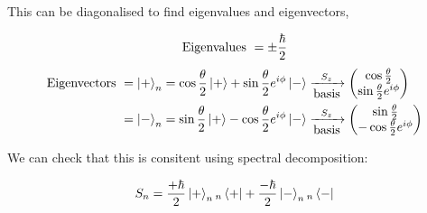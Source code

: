 \documentclass[english, 11pt]{article}
\begin{document}
      This can be diagonalised to find eigenvalues and eigenvectors,

      \[ \mbox{Eigenvalues } = \pm\frac{\hbar}{2} \]
     \begin{align*}
       \mbox{Eigenvectors } & = \left|+\right\rangle_n = \cos\frac{\theta}{2}\left|+\right\rangle + \sin\frac{\theta}{2}e^{i\phi}\left|-\right\rangle \xrightarrow[\mbox{basis}]{S_z} \left(\begin{matrix}\cos\frac{\theta}{2} \\ \sin\frac{\theta}{2}e^{i\phi}\end{matrix}\right) \\
        & = \left|-\right\rangle_n =  \sin\frac{\theta}{2}\left|+\right\rangle - \cos\frac{\theta}{2}e^{i\phi}\left|-\right\rangle  \xrightarrow[\mbox{basis}]{S_z} \left(\begin{matrix}\sin\frac{\theta}{2} \\ -\cos\frac{\theta}{2}e^{i\phi}\end{matrix}\right)
     \end{align*}

     We can check that this is consitent using spectral decomposition:

     \[ S_n = \frac{+\hbar}{2}\left|+\right\rangle_n{}_n\left\langle+\right| + \frac{-\hbar}{2}\left|-\right\rangle_n{}_n\left\langle-\right| \]
\end{document}
